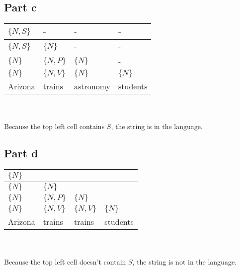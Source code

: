 \documentclass{article}%
\begin{document}
\subsection*{Part c}
\begin{tabular}{| l | l | l | l |}
    \hline
    $\{N, S\}$ & - & - & - \\
    \hline
    $\{N, S\}$ & $\{N\}$ & -  & - \\
    \hline
    $\{N\}$ & $\{N, P\}$ & $\{N\}$ & - \\
    \hline
    $\{N\}$ & $\{N, V\}$ & $\{N\}$ & $\{N\}$\\
    \hline
    Arizona & trains & astronomy & students \\
    \hline
\end{tabular}\\
\\
Because the top left cell contains $S$, the string is in the language.

\subsection*{Part d}

\begin{tabular}{| l | l | l | l |}
    \hline
    $\{N\}$ & & & \\
    \hline
    $\{N\}$ & $\{N\}$ & & \\
    \hline
    $\{N\}$ & $\{N, P\}$ & $\{N\}$ & \\
    \hline
    $\{N\}$ & $\{N, V\}$ & $\{N, V\}$ & $\{N\}$ \\
    \hline
    Arizona & trains & trains & students \\
    \hline
\end{tabular}\\
\\
Because the top left cell doesn't contain $S$, the string is not in the language.
\end{document}
